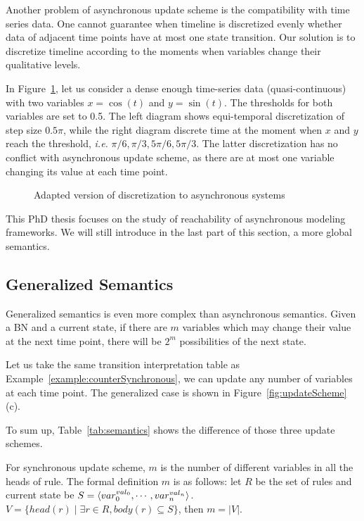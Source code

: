 Another problem of asynchronous update scheme is the compatibility with time series data.
One cannot guarantee when timeline is discretized evenly whether data of adjacent time points have at most one state transition. 
Our solution is to discretize timeline according to the moments when variables change their qualitative levels.

\begin{example}
In Figure~\ref{fig:discretization}, let us consider a dense enough time-series data (quasi-continuous) with two variables $x=\cos(t)$ and $y=\sin(t)$.
The thresholds for both variables are set to 0.5.
The left diagram shows equi-temporal discretization of step size $0.5\pi$, while the right diagram discrete time at the moment when $x$ and $y$ reach the threshold, \textit{i.e.} $\pi/6,\pi/3,5\pi/6,5\pi/3$.
The latter discretization has no conflict with asynchronous update scheme, as there are at most one variable changing its value at each time point. 
\end{example}

\begin{figure}[ht]
    \centering
    
    \caption[Discretization]{Adapted version of discretization to asynchronous systems}
    \label{fig:discretization}
\end{figure}


This PhD thesis focuses on the study of reachability of asynchronous modeling frameworks.
We will still introduce in the last part of this section, a more global semantics.

\subsection{Generalized Semantics}
Generalized semantics is even more complex than asynchronous semantics.
Given a BN and a current state, if there are $m$ variables which may change their value at the next time point, there will be $2^m$ possibilities of the next state.

\begin{example}
Let us take the same transition interpretation table as Example~\ref{example:counterSynchronous}, we can update any number of variables at each time point.
The generalized case is shown in Figure~\ref{fig:updateScheme} (c).
\end{example}

To sum up, Table~\ref{tab:semantics} shows the difference of those three update schemes.

For synchronous update scheme, $m$ is the number of different variables in all the heads of rule.
The formal definition $m$ is as follows:
let $R$ be the set of rules and current state be $S=\langle var_0^{val_0},\cdots, var_n^{val_n}\rangle$. 
$V=\{head(r)\mid \exists r\in R, body(r)\subseteq S\}$, then $m=|V|$.

